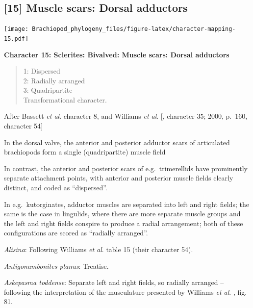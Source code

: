 \documentclass[openany]{book}
\theoremstyle{definition}
\theoremstyle{definition}
\theoremstyle{definition}
\theoremstyle{remark}
\begin{document}
\subsection*{{[}15{]} Muscle scars: Dorsal
adductors}\label{muscle-scars-dorsal-adductors}

\texttt{[image: Brachiopod\_phylogeny\_files/figure-latex/character-mapping-15.pdf]}

\textbf{Character 15: Sclerites: Bivalved: Muscle scars: Dorsal
adductors}

\begin{quote}
1: Dispersed\\
2: Radially arranged\\
3: Quadripartite\\
Transformational character.
\end{quote}

After Bassett \emph{et al}.
\citeyearpar{Bassett2001Functionalmorphology} character 8, and Williams
\emph{et al}. {[}\citet{Williams1996Asupra}, character 35; 2000, p.~160,
character 54{]}

In the dorsal valve, the anterior and posterior adductor scars of
articulated brachiopods form a single (quadripartite) muscle field
\citep[p.~201]{Williams2000LinguliformeaCraniiformea}

In contrast, the anterior and posterior scars of e.g.~trimerellids have
prominently separate attachment points, with anterior and posterior
muscle fields clearly distinct, and coded as ``dispersed''.

In e.g.~kutorginates, adductor muscles are separated into left and right
fields; the same is the case in lingulids, where there are more separate
muscle groups and the left and right fields conspire to produce a radial
arrangement; both of these configurations are scored as ``radially
arranged''.

\hypertarget{Alisina-coding-15}{}
\emph{Alisina}: Following Williams \emph{et al}.
\citeyearpar{Williams2000LinguliformeaCraniiformea} table 15 (their
character 54).

\hypertarget{Antigonambonites_planus-coding-15}{}
\emph{Antigonambonites planus}: Treatise.

\hypertarget{Askepasma_toddense-coding-15}{}
\emph{Askepasma toddense}: Separate left and right fields, so radially
arranged -- following the interpretation of the musculature presented by
Williams \emph{et al}.
\citeyearpar{Williams2000LinguliformeaCraniiformea}, fig. 81.
\end{document}
